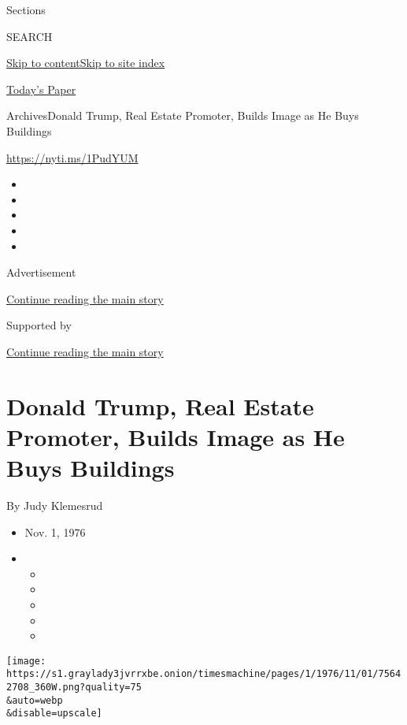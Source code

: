 Sections

SEARCH

\protect\hyperlink{site-content}{Skip to
content}\protect\hyperlink{site-index}{Skip to site index}

\href{https://myaccount.nytimes3xbfgragh.onion/auth/login?response_type=cookie\&client_id=vi}{}

\href{https://www.nytimes3xbfgragh.onion/section/todayspaper}{Today's
Paper}

Archives\textbar{}Donald Trump, Real Estate Promoter, Builds Image as He
Buys Buildings

\url{https://nyti.ms/1PudYUM}

\begin{itemize}
\item
\item
\item
\item
\item
\end{itemize}

Advertisement

\protect\hyperlink{after-top}{Continue reading the main story}

Supported by

\protect\hyperlink{after-sponsor}{Continue reading the main story}

\hypertarget{donald-trump-real-estate-promoter-builds-image-as-he-buys-buildings}{%
\section{Donald Trump, Real Estate Promoter, Builds Image as He Buys
Buildings}\label{donald-trump-real-estate-promoter-builds-image-as-he-buys-buildings}}

By Judy Klemesrud

\begin{itemize}
\item
  Nov. 1, 1976
\item
  \begin{itemize}
  \item
  \item
  \item
  \item
  \item
  \end{itemize}
\end{itemize}

\texttt{[image: https://s1.graylady3jvrrxbe.onion/timesmachine/pages/1/1976/11/01/75642708\_360W.png?quality=75\\\&auto=webp\\\&disable=upscale]}


